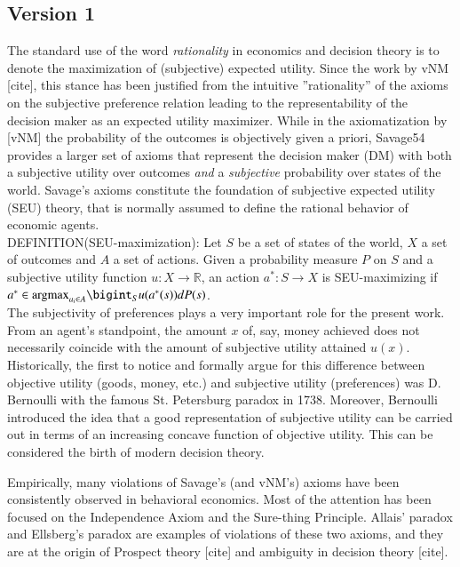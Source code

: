\documentclass[fleqn,reqno,11pt]{article}
\begin{document}
\subsection{Version 1}

The standard use of the word \textit{rationality} in economics and decision theory is to denote the maximization of (subjective) expected utility. Since the work by vNM [cite], this stance has been justified from the intuitive ''rationality'' of the axioms on the subjective preference relation leading to the representability of the decision maker as an expected utility maximizer. 
While in the axiomatization by [vNM] the probability of the outcomes is objectively given a priori, Savage54 provides a larger set of axioms that represent the decision maker (DM) with both a subjective utility over outcomes \textit{and} a \textit{subjective} probability over states of the world. Savage's axioms constitute the foundation of subjective expected utility (SEU) theory, that is normally assumed to define the rational behavior of economic agents.\\

DEFINITION(SEU-maximization): Let $S$ be a set of states of the world, $X$ a set of outcomes and $A$ a set of actions. Given a probability measure $P$ on $S$ and a subjective utility function $u:X \rightarrow \mathbb{R} $, an action $a^*: S \rightarrow X $ is SEU-maximizing if $a^* \in \text{argmax}_{a_i \in A} \bigint_S u(a^*(s))dP(s) $. \\

The subjectivity of preferences plays a very important
role for the present work. From an agent's standpoint, the amount $x$ of, say, money achieved does not necessarily
coincide with the amount of subjective utility attained $u(x)$. 
Historically,  the first to notice and formally argue for this difference
between objective utility (goods, money, etc.) and subjective utility (preferences) was
D. Bernoulli with the famous St. Petersburg paradox in 1738. Moreover, Bernoulli introduced the idea that a good representation of
subjective utility can be carried out in terms of an increasing concave function of objective
utility. This can be considered the birth of modern decision theory.

Empirically, many violations of Savage's (and vNM's) axioms have been consistently observed in behavioral economics. Most of the attention has been focused on the Independence Axiom and the Sure-thing Principle. Allais' paradox and Ellsberg's paradox are examples of violations of these two axioms, and they are at the origin of Prospect theory [cite] and ambiguity in decision theory [cite].
\end{document}

